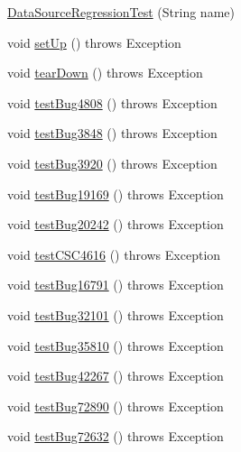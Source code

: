 \begin{DoxyCompactItemize}
\item 
\mbox{\hyperlink{classtestsuite_1_1regression_1_1_data_source_regression_test_ab2c694d826548de54ca0b8397a78293c}{Data\+Source\+Regression\+Test}} (String name)
\item 
void \mbox{\hyperlink{classtestsuite_1_1regression_1_1_data_source_regression_test_a0f701712ab1a3a10727059063fee1ece}{set\+Up}} ()  throws Exception 
\item 
void \mbox{\hyperlink{classtestsuite_1_1regression_1_1_data_source_regression_test_a8832a43271bfaaf86c320113cf001ecd}{tear\+Down}} ()  throws Exception 
\item 
void \mbox{\hyperlink{classtestsuite_1_1regression_1_1_data_source_regression_test_a549c69563bb8fff0dbc64c72d6867f69}{test\+Bug4808}} ()  throws Exception 
\item 
void \mbox{\hyperlink{classtestsuite_1_1regression_1_1_data_source_regression_test_a8996aec86e7e81696fa451b9d9b457f2}{test\+Bug3848}} ()  throws Exception 
\item 
void \mbox{\hyperlink{classtestsuite_1_1regression_1_1_data_source_regression_test_ac91c1a6dd9a345d051941b69a3193e57}{test\+Bug3920}} ()  throws Exception 
\item 
void \mbox{\hyperlink{classtestsuite_1_1regression_1_1_data_source_regression_test_a9ef6137b8f62a30be45c74a81be1d299}{test\+Bug19169}} ()  throws Exception 
\item 
void \mbox{\hyperlink{classtestsuite_1_1regression_1_1_data_source_regression_test_a59191cb9aeb387f68d1d484356d9c744}{test\+Bug20242}} ()  throws Exception 
\item 
void \mbox{\hyperlink{classtestsuite_1_1regression_1_1_data_source_regression_test_a151cb2069ead1819a419cadc6e3e126b}{test\+C\+S\+C4616}} ()  throws Exception 
\item 
void \mbox{\hyperlink{classtestsuite_1_1regression_1_1_data_source_regression_test_af69d51f59966174507009b456bcc4ef3}{test\+Bug16791}} ()  throws Exception 
\item 
void \mbox{\hyperlink{classtestsuite_1_1regression_1_1_data_source_regression_test_afbc8307057c46d97d66b67f78f567cb5}{test\+Bug32101}} ()  throws Exception 
\item 
void \mbox{\hyperlink{classtestsuite_1_1regression_1_1_data_source_regression_test_a8decbce2b9442cfc9e96358e3b18f2a4}{test\+Bug35810}} ()  throws Exception 
\item 
void \mbox{\hyperlink{classtestsuite_1_1regression_1_1_data_source_regression_test_a1245631ae5a6845eb5ddbb827815d8f4}{test\+Bug42267}} ()  throws Exception 
\item 
void \mbox{\hyperlink{classtestsuite_1_1regression_1_1_data_source_regression_test_ae91b4203179883e6c257ba0484c9974e}{test\+Bug72890}} ()  throws Exception 
\item 
void \mbox{\hyperlink{classtestsuite_1_1regression_1_1_data_source_regression_test_abba082ff766209732ff52f20bfe77cae}{test\+Bug72632}} ()  throws Exception 
\end{DoxyCompactItemize}
